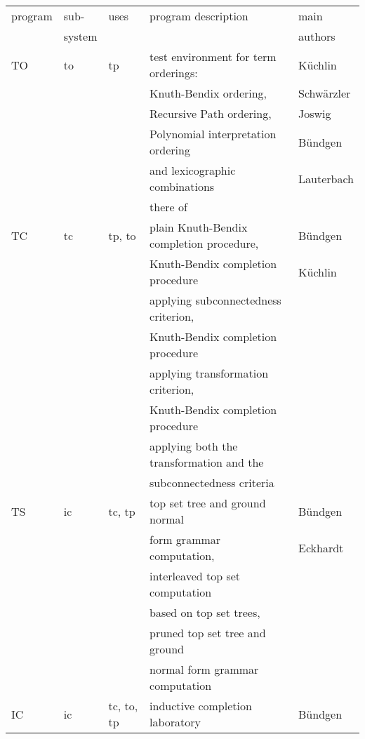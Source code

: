 \begin{table}
 \centering
 \begin{tabular}{|l|l|l|l|l|}
  \hline
  program & sub-   & uses & program description & main \\ 
          & system &      &                     & authors \\
   \hline\hline
   TO & to &  tp & test environment for term orderings: & K\"{u}chlin \\
      &    &     & Knuth-Bendix ordering,               & Schw\"arzler \\
      &    &     & Recursive Path ordering,             & Joswig \\
      &    &     & Polynomial interpretation ordering   & B\"{u}ndgen \\
      &    &     & and lexicographic combinations       & Lauterbach \\
      &    &     & there of                             &  \\
  \hline
   TC & tc & tp, to & plain Knuth-Bendix completion procedure, & B\"{u}ndgen \\ 
      &    &        & Knuth-Bendix completion procedure        & K\"{u}chlin \\
      &    &        & applying subconnectedness criterion,     & \\ 
      &    &        & Knuth-Bendix completion procedure        & \\
      &    &        & applying transformation  criterion,      & \\ 
      &    &        & Knuth-Bendix completion procedure        & \\
      &    &        & applying both the transformation and the & \\
      &    &        & subconnectedness criteria                & \\ 
  \hline
   TS & ic & tc, tp & top set tree and ground normal   & B\"{u}ndgen \\
      &    &        & form grammar computation,        & Eckhardt \\ 
      &    &        & interleaved top set computation  & \\
      &    &        & based on top set trees,          & \\ 
      &    &        & pruned top set tree and ground   & \\
      &    &        & normal form grammar computation  & \\ 
  \hline
   IC  & ic &tc, to, tp & inductive completion laboratory   & B\"{u}ndgen \\

\end{tabular}
\end{table}
